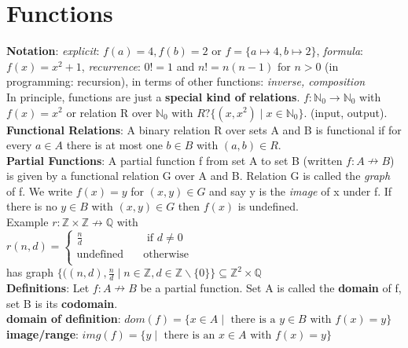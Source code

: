 \section*{Functions} 
\textbf{Notation}: \textit{explicit}: $f(a) = 4, f(b) = 2$ or $f = \{a \mapsto 4, b \mapsto 2\}$, \textit{formula}: $f(x) = x^2 + 1$, \textit{recurrence}: $0! = 1$ and $n! = n(n-1) \text{ for } n > 0$ (in programming: recursion), in terms of other functions: \textit{inverse, composition} \\
In principle, functions are just a\textbf{ special kind of relations}. $f: \mathbb{N}_0 \rightarrow \mathbb{N}_0$ with $f(x) = x^2$ or relation R over $\mathbb{N}_0$ with $R ? \{(x, x^2) \mid x \in \mathbb{N}_0\}$. (input, output). \\
\textbf{Functional Relations}: A binary relation R over sets A and B is functional if for every $a \in A$ there is at most one $b \in B$  with $(a,b) \in R$. \vspace{20pt} \\ 
\textbf{Partial Functions}: A partial function f from set A to set B (written $f: A \nrightarrow B$) is given by a functional relation G over A and B. Relation G is called the \textit{graph} of f. We write $f(x) = y$ for $(x,y) \in G$ and say y is the \textit{image} of x under f. If there is no $y \in B$ with $(x,y) \in G$ then $f(x)$ is undefined. \\
Example $r: \mathbb{Z} \times \mathbb{Z} \nrightarrow \mathbb{Q}$ with\\
$ r(n,d) =
     \begin{cases}
       \frac{n}{d} &\quad\text{ if } d \neq 0\\
       \text{undefined} &\quad\text{otherwise} \\
     \end{cases}$ 
\\ has graph $\{((n,d), \frac{n}{d} \mid n \in \mathbb{Z}, d \in \mathbb{Z} \backslash \{0\}\} \subseteq \mathbb{Z}^2 \times \mathbb{Q}$ \\
\textbf{Definitions}: Let  $f: A \nrightarrow B$ be a partial function. Set A is called the \textbf{domain} of f, set B is its \textbf{codomain}.  \\
\textbf{domain of definition}: $dom(f) = \{x \in A \mid \text{ there is a } y \in B \text{ with } f(x) = y\}$ \\
\textbf{image/range}: $img(f) = \{y \mid \text{ there is an } x \in A \text{ with } f(x) = y\}$ \\

